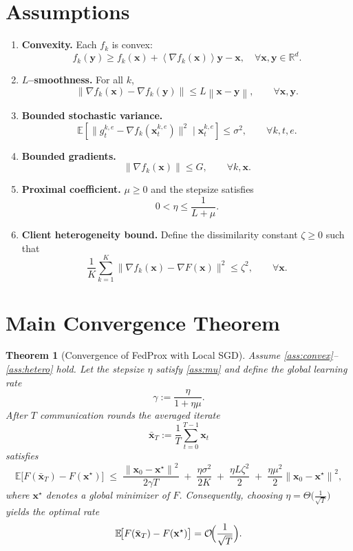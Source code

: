\documentclass{article}
\newtheorem{theorem}{Theorem}
\newcommand{\E}{\mathbb{E}}
\newcommand{\R}{\mathbb{R}}
\newcommand{\norm}[1]{\left\|#1\right\|}
\newcommand{\inner}[1]{\left\langle#1\right\rangle}
\begin{document}
\newpage
\section*{Assumptions}
\begin{enumerate}[label=\textbf{A\arabic*}]
\item \label{ass:convex} \textbf{Convexity.} Each $f_k$ is convex:
\[
f_k(\mathbf{y})\ge f_k(\mathbf{x})+\inner{\nabla f_k(\mathbf{x})}{\mathbf{y}-\mathbf{x}},\quad\forall\mathbf{x},\mathbf{y}\in\R^d.
\]

\item \label{ass:smooth} \textbf{$L$–smoothness.} For all $k$,
\[
\norm{\nabla f_k(\mathbf{x})-\nabla f_k(\mathbf{y})}\le L\norm{\mathbf{x}-\mathbf{y}},\qquad\forall\mathbf{x},\mathbf{y}.
\]

\item \label{ass:boundedvar} \textbf{Bounded stochastic variance.}
\[
\E\!\left[\|g_{t}^{k,e}-\nabla f_k(\mathbf{x}_{t}^{k,e})\|^2\mid\mathbf{x}_{t}^{k,e}\right]\le\sigma^2,\qquad\forall k,t,e.
\]

\item \label{ass:boundedgrad} \textbf{Bounded gradients.}
\[
\|\nabla f_k(\mathbf{x})\|\le G,\qquad\forall k,\mathbf{x}.
\]

\item \label{ass:mu} \textbf{Proximal coefficient.} $\mu\ge0$ and the stepsize satisfies
\[
0<\eta\le\frac{1}{L+\mu}.
\]

\item \label{ass:hetero} \textbf{Client heterogeneity bound.}
Define the dissimilarity constant $\zeta\ge0$ such that
\[
\frac1K\sum_{k=1}^K\|\nabla f_k(\mathbf{x})-\nabla F(\mathbf{x})\|^2\le\zeta^2,\qquad\forall\mathbf{x}.
\]
\end{enumerate}

\section*{Main Convergence Theorem}
\begin{theorem}[Convergence of FedProx with Local SGD]\label{thm:main}
Assume \ref{ass:convex}–\ref{ass:hetero} hold. Let the stepsize $\eta$ satisfy \ref{ass:mu} and define the global learning rate
\[
\gamma:=\frac{\eta}{1+\eta\mu}.
\]
After $T$ communication rounds the averaged iterate
\[
\bar{\mathbf{x}}_T:=\frac1T\sum_{t=0}^{T-1}\mathbf{x}_t
\]
satisfies
\[
\E\!\bigl[F(\bar{\mathbf{x}}_T)-F(\mathbf{x}^\star)\bigr]\;\le\;
\frac{\norm{\mathbf{x}_0-\mathbf{x}^\star}^2}{2\gamma T}
\;+\;
\frac{\eta\sigma^2}{2K}
\;+\;
\frac{\eta L\zeta^2}{2}
\;+\;
\frac{\eta\mu^2}{2}\norm{\mathbf{x}_0-\mathbf{x}^\star}^2,
\tag{3}
\]
where $\mathbf{x}^\star$ denotes a global minimizer of $F$.
Consequently, choosing $\eta= \Theta\!\bigl(\tfrac{1}{\sqrt{T}}\bigr)$ yields the optimal rate
\[
\E\!\bigl[F(\bar{\mathbf{x}}_T)-F(\mathbf{x}^\star)\bigr]=\mathcal{O}\!\Bigl(\frac{1}{\sqrt{T}}\Bigr).
\]
\end{theorem}
\end{document}
